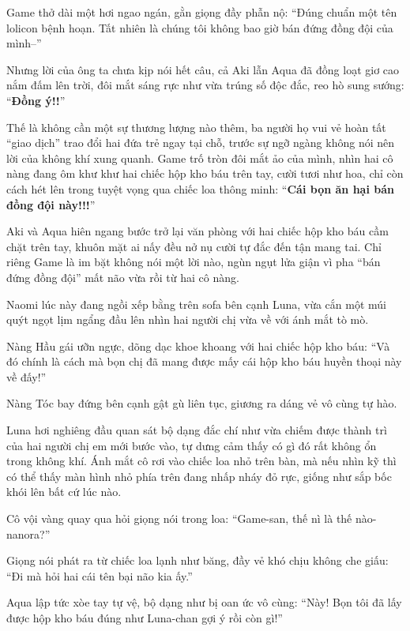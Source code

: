 \documentclass[../main.tex]{subfiles}
\begin{document}
Game thở dài một hơi ngao ngán, gằn giọng đầy phẫn nộ: ``Đúng chuẩn một tên lolicon bệnh hoạn. Tất nhiên là chúng tôi không bao giờ bán đứng đồng đội của mình--''

Nhưng lời của ông ta chưa kịp nói hết câu, cả Aki lẫn Aqua đã đồng loạt giơ cao nắm đấm lên trời, đôi mắt sáng rực như vừa trúng số độc đắc, reo hò sung sướng: ``\textbf{Đồng ý!!}''

Thế là không cần một sự thương lượng nào thêm, ba người họ vui vẻ hoàn tất ``giao dịch'' trao đổi hai đứa trẻ ngay tại chỗ, trước sự ngỡ ngàng không nói nên lời của không khí xung quanh. Game trố tròn đôi mắt ảo của mình, nhìn hai cô nàng đang ôm khư khư hai chiếc hộp kho báu trên tay, cười tươi như hoa, chỉ còn cách hét lên trong tuyệt vọng qua chiếc loa thông minh: ``\textbf{Cái bọn ăn hại bán đồng đội này!!!}''

\ct

Aki và Aqua hiên ngang bước trở lại văn phòng với hai chiếc hộp kho báu cầm chặt trên tay, khuôn mặt ai nấy đều nở nụ cười tự đắc đến tận mang tai. Chỉ riêng Game là im bặt không nói một lời nào, ngùn ngụt lửa giận vì pha ``bán đứng đồng đội'' mất não vừa rồi từ hai cô nàng.

Naomi lúc này đang ngồi xếp bằng trên sofa bên cạnh Luna, vừa cắn một múi quýt ngọt lịm ngẩng đầu lên nhìn hai người chị vừa về với ánh mắt tò mò.

Nàng Hầu gái ưỡn ngực, dõng dạc khoe khoang với hai chiếc hộp kho báu: ``Và đó chính là cách mà bọn chị đã mang được mấy cái hộp kho báu huyền thoại này về đấy!''

Nàng Tóc bay đứng bên cạnh gật gù liên tục, giương ra dáng vẻ vô cùng tự hào.

Luna hơi nghiêng đầu quan sát bộ dạng đắc chí như vừa chiếm được thành trì của hai người chị em mới bước vào, tự dưng cảm thấy có gì đó rất không ổn trong không khí. Ánh mắt cô rơi vào chiếc loa nhỏ trên bàn, mà nếu nhìn kỹ thì có thể thấy màn hình nhỏ phía trên đang nhấp nháy đỏ rực, giống như sắp bốc khói lên bất cứ lúc nào.


Cô vội vàng quay qua hỏi giọng nói trong loa: ``Game-san, thế nì là thế nào-nanora?''

Giọng nói phát ra từ chiếc loa lạnh như băng, đầy vẻ khó chịu không che giấu: ``Đi mà hỏi hai cái tên bại não kia ấy.''

Aqua lập tức xòe tay tự vệ, bộ dạng như bị oan ức vô cùng: ``Này! Bọn tôi đã lấy được hộp kho báu đúng như Luna-chan gợi ý rồi còn gì!''
\end{document}
